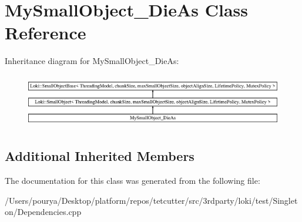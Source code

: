 \hypertarget{classMySmallObject__DieAs}{}\section{My\+Small\+Object\+\_\+\+Die\+As Class Reference}
\label{classMySmallObject__DieAs}
Inheritance diagram for My\+Small\+Object\+\_\+\+Die\+As\+:\begin{figure}[H]
\begin{center}
\leavevmode
\includegraphics[height=2.366197cm]{classMySmallObject__DieAs}
\end{center}
\end{figure}
\subsection*{Additional Inherited Members}


The documentation for this class was generated from the following file\+:\begin{DoxyCompactItemize}
\item 
/\+Users/pourya/\+Desktop/platform/repos/tetcutter/src/3rdparty/loki/test/\+Singleton/Dependencies.\+cpp\end{DoxyCompactItemize}
